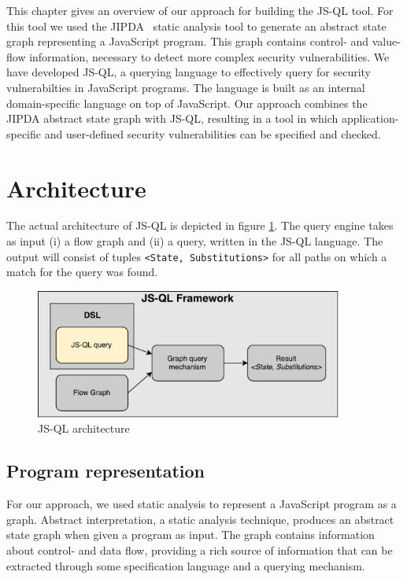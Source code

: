 This chapter gives an overview of our approach for building the JS-QL tool. For this tool we used the JIPDA~\cite{functionPurity} static analysis tool to generate an abstract state graph representing a JavaScript program. This graph contains control- and value-flow information, necessary to detect more complex security vulnerabilities. We have developed JS-QL, a querying language to effectively query for security vulnerabilties in JavaScript programs. The language is built as an internal domain-specific language on top of JavaScript. Our approach combines the JIPDA abstract state graph with JS-QL, resulting in a tool in which application-specific and user-defined security vulnerabilities can be specified and checked.

\section{Architecture}
\label{sec:Architecture}

The actual architecture of JS-QL is depicted in figure \ref{fig:architecture}. The query engine takes as input (i) a flow graph and (ii) a query, written in the JS-QL language. The output will consist of tuples \texttt{<State, Substitutions>} for all paths on which a match for the query was found.

\begin{figure}
    \centering
      \includegraphics[width=0.9\textwidth]{images/Architecture} 
      \caption{JS-QL architecture}
    \label{fig:architecture}
\end{figure}

\subsection*{Program representation}

For our approach, we used static analysis to represent a JavaScript program as a graph. Abstract interpretation, a static analysis technique, produces an abstract state graph when given a program as input. The graph contains information about control- and data flow, providing a rich source of information that can be extracted through some specification language and a querying mechanism. 

